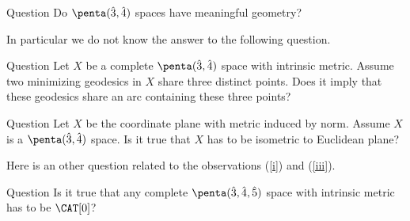 \documentclass[oneside,a4paper]{amsart}
\begin{document}
\begin{thm}{Question}
 Do $\penta(\hat 3,\hat 4)$ spaces have meaningful geometry?
\end{thm}
In particular we do not know the answer to the following question.

\begin{thm}{Question}
Let $X$ be a complete $\penta(\hat 3,\hat 4)$ space with intrinsic metric.
Assume two minimizing geodesics in $X$ share three distinct points.
Does it imply that these geodesics share an arc containing these three points?
\end{thm}

\begin{thm}{Question}
Let $X$ be the coordinate plane with metric induced by norm.
Assume $X$ is a $\penta(\hat 3,\hat 4)$ space.
Is it true that $X$ has to be isometric to Euclidean plane?
\end{thm}


Here is an other question related to the observations (\ref{i}) and (\ref{iii}).

\begin{thm}{Question}
Is it true that any complete  $\penta(\hat 3,\hat 4,\hat 5)$ space with intrinsic metric has to be $\CAT[0]$?
\end{thm} 
\end{document}

